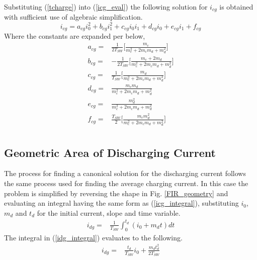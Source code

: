 \documentclass[conference]{IEEEtran}
\begin{document}
Substituting (\ref{tcharge}) into (\ref{icg_eval}) the following solution for \(i_{cg}\) is obtained with sufficient use of algebraic simplification.
\begin{equation}
i_{cg} = a_{cg}i_0^2+b_{cg}i_1^2+c_{cg}i_0i_1+d_{cg}i_0+e_{cg}i_1+f_{cg} \label{i_cg_canon}
\end{equation}
Where the constants are expanded per below,
\begin{align*}
a_{cg} = & \frac{1}{2T_{SW}} \bigg[ \frac{m_c}{m_c^2+2m_cm_d+m_d^2} \bigg]\nonumber\\
b_{cg} = & -\frac{1}{2T_{SW}} \bigg[ \frac{m_c + 2m_d}{m_c^2+2m_cm_d+m_d^2} \bigg]\nonumber\\
c_{cg} = & \frac{1}{T_{SW}} \bigg[  \frac{m_d}{m_c^2+2m_cm_d+m_d^2} \bigg] \nonumber\\
d_{cg} = & \frac{m_cm_d}{m_c^2+2m_cm_d+m_d^2}\nonumber\\
e_{cg} = & \frac{m_d^2}{m_c^2+2m_cm_d+m_d^2}\nonumber\\
f_{cg} = & \frac{T_{SW}}{2} \bigg[ \frac{m_c m_d^2}{m_c^2+2m_cm_d+m_d^2} \bigg]\nonumber\\
\end{align*}

\subsection{Geometric Area of Discharging Current}
The process for finding a canonical solution for the discharging current follows the same process used for finding the average charging current. In this case the problem is simplified by reversing the shape in Fig. \ref{FIR_geometry} and evaluating an integral having the same form as (\ref{icg_integral}), substituting $i_0$, $m_d$ and $t_d$ for the initial current, slope and time variable.
\begin{align}
i_{dg} = & \frac{1}{T_{SW}}\int_0^{t_d}(i_0 + m_d t)dt \label{idg_integral}
\end{align}
The integral in (\ref{idg_integral}) evaluates to the following.
\begin{align}
i_{dg} = & \frac{t_d}{T_{SW}} i_0 + \frac{m_dt_d^2}{2T_{SW}}
\label{idg_integral_eval}
\end{align}
\end{document}
